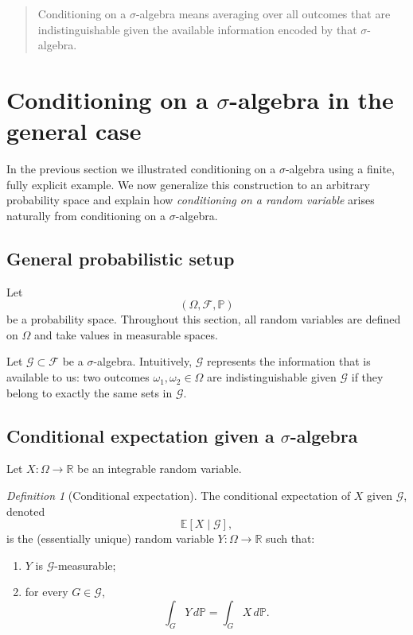 \documentclass[11pt]{article}
\theoremstyle{remark}
\newtheorem{definition}{Definition}[section]
\begin{document}
\begin{quote}
Conditioning on a $\sigma$-algebra means averaging over all outcomes that are
indistinguishable given the available information encoded by that $\sigma$-algebra.
\end{quote}


\section{Conditioning on a $\sigma$-algebra in the general case}

In the previous section we illustrated conditioning on a $\sigma$-algebra using a
finite, fully explicit example. We now generalize this construction to an arbitrary
probability space and explain how \emph{conditioning on a random variable} arises
naturally from conditioning on a $\sigma$-algebra.

\subsection{General probabilistic setup}

Let
\[
(\Omega,\mathcal F,\mathbb P)
\]
be a probability space. Throughout this section, all random variables are defined on
$\Omega$ and take values in measurable spaces.

Let $\mathcal G\subset\mathcal F$ be a $\sigma$-algebra. Intuitively, $\mathcal G$
represents the information that is available to us: two outcomes
$\omega_1,\omega_2\in\Omega$ are indistinguishable given $\mathcal G$ if they belong
to exactly the same sets in $\mathcal G$.

\subsection{Conditional expectation given a $\sigma$-algebra}

Let $X:\Omega\to\mathbb R$ be an integrable random variable.

\begin{definition}[Conditional expectation]
The conditional expectation of $X$ given $\mathcal G$, denoted
\[
\mathbb E[X\mid\mathcal G],
\]
is the (essentially unique) random variable $Y:\Omega\to\mathbb R$ such that:
\begin{enumerate}
  \item $Y$ is $\mathcal G$-measurable;
  \item for every $G\in\mathcal G$,
  \[
  \int_G Y\,d\mathbb P
  =
  \int_G X\,d\mathbb P.
  \]
\end{enumerate}
\end{definition}
\end{document}
